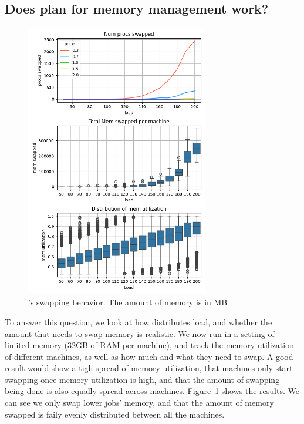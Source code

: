\subsection{Does \sys{} plan for memory management work?}

\begin{figure}[t!]
    \centering
      \includegraphics[width=8cm]{img/memory_graphs.png}
      \caption{ \sys{}'s swapping behavior. The amount of memory is in MB  }
    \label{fig:memory-graphs}
\end{figure}

To answer this question, we look at how \sys{} distributes load, and whether the
amount that \sys{} needs to swap memory is realistic. We now run \sys{} in a
setting of limited memory (32GB of RAM per machine), and track the memory
utilization of different machines, as well as how much and what they need to
swap. A good result would show a tigh spread of memory utilization, that
machines only start swapping once memory utilization is high, and that the
amount of swapping being done is also equally spread across machines.
Figure~\ref{fig:memory-graphs} shows the results. We can see we only swap lower
\class{} jobs' memory, and that the amount of memory swapped is faily evenly
distributed between all the machines.


